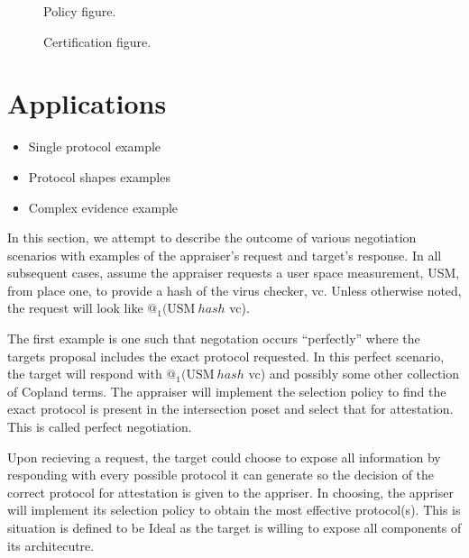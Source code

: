 \documentclass[sigconf,authordraft]{acmart}
\begin{document}
\begin{figure}[hbtp]
  \centering 
  \caption[Attestation process]{Policy figure.}
  \label{fig:policy-fig-embed}
\end{figure}


\begin{figure}[hbtp]
  \centering 
  \caption[Attestation process]{Certification figure.}
  \label{fig:certification-fig}
\end{figure}

\section{Applications}

\begin{itemize}
\item Single protocol example
\item Protocol shapes examples
\item Complex evidence example

\end{itemize}

  
In this section, we attempt to describe the outcome of various
negotiation scenarios with examples of the appraiser's request and
target's response. In all subsequent cases, assume the appraiser
requests a user space measurement, USM, from place one, to provide a
hash of the virus checker, vc. Unless otherwise noted, the request
will look like $@_1 (\text{USM}\: hash$ vc).

The first example is one such that negotation occurs ``perfectly''
where the targets proposal includes the exact protocol requested. In
this \gls{perfect} scenario, the target will respond with
$@_1 (\text{USM}\: hash$ vc) and possibly some other collection of
Copland terms. The appraiser will implement the selection policy to
find the exact protocol is present in the intersection poset and
select that for attestation. This is called perfect negotiation.

Upon recieving a request, the target could choose to expose all
information by responding with every possible protocol it can generate
so the decision of the correct protocol for attestation is given to
the appriser. In choosing, the appriser will implement its selection
policy to obtain the most effective protocol(s). This is situation is
defined to be \gls{Ideal} as the target is willing to expose all
components of its architecutre.
\end{document}
